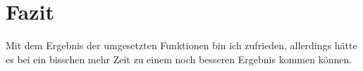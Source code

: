 \chapter{Fazit}

Mit dem Ergebnis der umgesetzten Funktionen bin ich zufrieden, allerdings hätte es bei ein bisschen mehr Zeit zu einem noch besseren Ergebnis kommen können. 